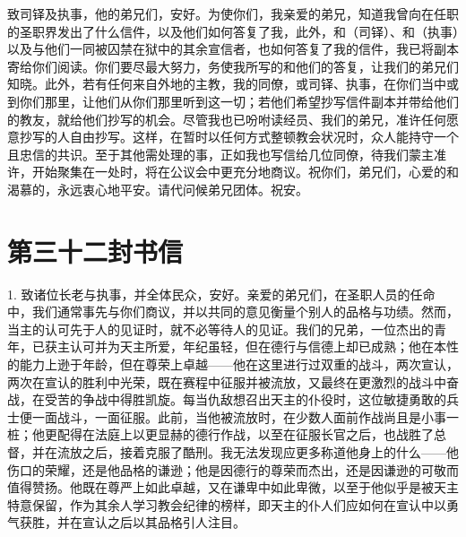 致司铎及执事，他的弟兄们，安好。为使你们，我亲爱的弟兄，知道我曾向在任职的圣职界发出了什么信件，以及他们如何答复了我，此外，和（司铎）、和（执事）以及与他们一同被囚禁在狱中的其余宣信者，也如何答复了我的信件，我已将副本寄给你们阅读。你们要尽最大努力，务使我所写的和他们的答复，让我们的弟兄们知晓。此外，若有任何来自外地的主教，我的同僚，或司铎、执事，在你们当中或到你们那里，让他们从你们那里听到这一切；若他们希望抄写信件副本并带给他们的教友，就给他们抄写的机会。尽管我也已吩咐读经员、我们的弟兄，准许任何愿意抄写的人自由抄写。这样，在暂时以任何方式整顿教会状况时，众人能持守一个且忠信的共识。至于其他需处理的事，正如我也写信给几位同僚，待我们蒙主准许，开始聚集在一处时，将在公议会中更充分地商议。祝你们，弟兄们，心爱的和渴慕的，永远衷心地平安。请代问候弟兄团体。祝安。\par



\section{第三十二封书信}

\par

\par

1. 致诸位长老与执事，并全体民众，安好。亲爱的弟兄们，在圣职人员的任命中，我们通常事先与你们商议，并以共同的意见衡量个别人的品格与功绩。然而，当主的认可先于人的见证时，就不必等待人的见证。我们的兄弟，一位杰出的青年，已获主认可并为天主所爱，年纪虽轻，但在德行与信德上却已成熟；他在本性的能力上逊于年龄，但在尊荣上卓越——他在这里进行过双重的战斗，两次宣认，两次在宣认的胜利中光荣，既在赛程中征服并被流放，又最终在更激烈的战斗中奋战，在受苦的争战中得胜凯旋。每当仇敌想召出天主的仆役时，这位敏捷勇敢的兵士便一面战斗，一面征服。此前，当他被流放时，在少数人面前作战尚且是小事一桩；他更配得在法庭上以更显赫的德行作战，以至在征服长官之后，也战胜了总督，并在流放之后，接着克服了酷刑。我无法发现应更多称道他身上的什么——他伤口的荣耀，还是他品格的谦逊；他是因德行的尊荣而杰出，还是因谦逊的可敬而值得赞扬。他既在尊严上如此卓越，又在谦卑中如此卑微，以至于他似乎是被天主特意保留，作为其余人学习教会纪律的榜样，即天主的仆人们应如何在宣认中以勇气获胜，并在宣认之后以其品格引人注目。\par

